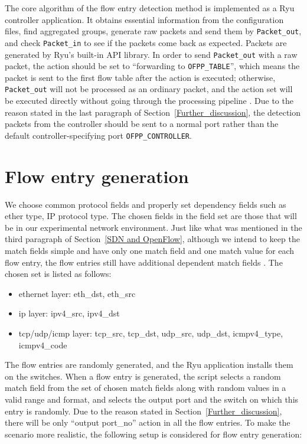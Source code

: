 The core algorithm of the flow entry detection method is implemented as a Ryu controller application. It obtains essential information from the configuration files, find aggregated groups, generate raw packets and send them by \texttt{Packet\_out}, and check \texttt{Packet\_in} to see if the packets come back as expected. Packets are generated by Ryu's built-in API library. In order to send \texttt{Packet\_out} with a raw packet, the action should be set to ``forwarding to \texttt{OFPP\_TABLE}'', which means the packet is sent to the first flow table after the action is executed; otherwise, \texttt{Packet\_out} will not be processed as an ordinary packet, and the action set will be executed directly without going through the processing pipeline \cite{PACKETOUT}. Due to the reason stated in the last paragraph of Section~\ref{Further_discussion}, the detection packets from the controller should be sent to a normal port rather than the default controller-specifying port \texttt{OFPP\_CONTROLLER}. 

\section{Flow entry generation}
We choose common protocol fields and properly set dependency fields such as ether type, IP protocol type. The chosen fields in the field set are those that will be in our experimental network environment. Just like what was mentioned in the third paragraph of Section~\ref{SDN and OpenFlow}, although we intend to keep the match fields simple and have only one match field and one match value for each flow entry, the flow entries still have additional dependent match fields . The chosen set is listed as follows:

\begin{itemize}
\item
ethernet layer: eth\_dst, eth\_src
\item
ip layer: ipv4\_src, ipv4\_dst
\item
tcp/udp/icmp layer: tcp\_src, tcp\_dst, udp\_src, udp\_dst, icmpv4\_type, icmpv4\_code
\end{itemize}

The flow entries are randomly generated, and the Ryu application installs them on the switches. When a flow entry is generated, the script selects a random match field from the set of chosen match fields along with random values in a valid range and format, and selects the output port and the switch on which this entry is randomly. Due to the reason stated in Section~\ref{Further_discussion}, there will be only ``output port\_no'' action in all the flow entries. To make the scenario more realistic, the following setup is considered for flow entry generation:


